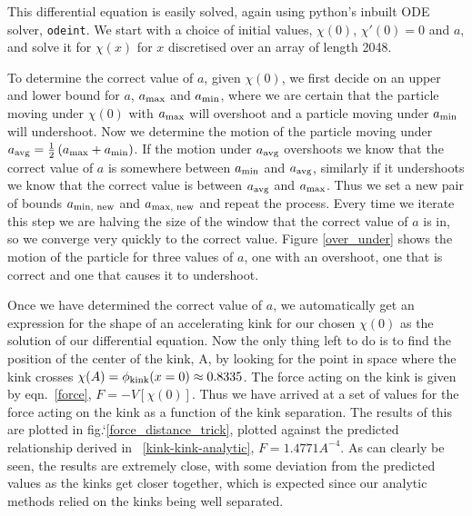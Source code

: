 \documentclass[11pt, oneside]{article}  	%
\numberwithin{equation}{section}
\begin{document}
 This differential equation is easily solved, again using python's inbuilt ODE solver, \texttt{odeint}. We start with a choice of initial values, $\chi(0)$, $\chi'(0) = 0$ and $a$, and solve it for $\chi(x)$ for $x$ discretised over an array of length 2048.\par
To determine the correct value of $a$, given $\chi(0)$, we first decide on an upper and lower bound for $a$, $a_\textup{max}$ and $a_\textup{min}$, where we are certain that the particle moving under $\chi(0)$ with $a_\textup{max}$ will overshoot and a particle moving under $a_\textup{min}$ will undershoot. Now we determine the motion of the particle moving under $a_\textup{avg} = \frac{1}{2} \left ( a_\textup{max} + a_\textup{min} \right )$. If the motion under $a_\textup{avg}$ overshoots we know that the correct value of $a$ is somewhere between $a_\textup{min}$ and $a_\textup{avg}$, similarly if it undershoots we know that the correct value is between $a_\textup{avg}$ and $a_\textup{max}$. Thus we set a new pair of bounds $a_\textup{min, new}$ and $a_\textup{max, new}$ and repeat the process. Every time we iterate this step we are halving the size of the window that the correct value of $a$ is in, so we converge very quickly to the correct value. Figure \ref{over_under} shows the motion of the particle for three values of $a$, one with an overshoot, one that is correct and one that causes it to undershoot.\par
Once we have determined the correct value of $a$, we automatically get an expression for the shape of an accelerating kink for our chosen $\chi(0)$ as the solution of our differential equation. Now the only thing left to do is to find the position of the center of the kink, A, by looking for the point in space where the kink crosses $\chi(A) = \phi_\textup{kink}(x=0) \approx 0.8335$. The force acting on the kink is given by eqn.~\ref{force}, $F = -V[\chi(0)]$. Thus we have arrived at a set of values for the force acting on the kink as a function of the kink separation. The results of this are plotted in fig.`\ref{force_distance_trick}, plotted against the predicted relationship derived in \textsection~\ref{kink-kink-analytic}, $F = 1.4771A^{-4}$. As can clearly be seen, the results are extremely close, with some deviation from the predicted values as the kinks get closer together, which is expected since our analytic methods relied on the kinks being well separated.
\end{document}
